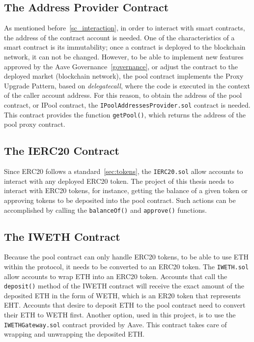 \documentclass[11pt,a4paper]{report}
\begin{document}
\subsection{The Address Provider Contract}
As mentioned before~\ref{sc_interaction}, in order to interact with smart contracts, the address of the contract account is needed. One of the characteristics of a smart contract is its immutability; once a contract is deployed to the blockchain network, it can not be changed. However, to be able to implement new features approved by the Aave Governance~\ref{governance}, or adjust the contract to the deployed market (blockchain network), the pool contract implements the Proxy Upgrade Pattern\cite{ozproxy}, based on \textit{delegatecall}\cite{delegatecall}, where the code is executed in the context of the caller account address. For this reason, to obtain the address of the pool contract, or IPool contract, the \verb|IPoolAddressesProvider.sol|\cite{pooladdrprov} contract is needed. This contract provides the function \verb|getPool()|, which returns the address of the pool proxy contract.

\subsection{The IERC20 Contract}
Since ERC20 follows a standard~\ref{sec:tokens}, the \verb|IERC20.sol| allow accounts to interact with any deployed ERC20 token. The project of this thesis needs to interact with ERC20 tokens, for instance, getting the balance of a given token or approving tokens to be deposited into the pool contract. Such actions can be accomplished by calling the \verb|balanceOf()| and \verb|approve()| functions.
\subsection{The IWETH Contract}
Because the pool contract can only handle ERC20 tokens, to be able to use ETH within the protocol, it needs to be converted to an ERC20 token. The \verb|IWETH.sol| allow accounts to wrap ETH into an ERC20 token. Accounts that call the \verb|deposit()| method of the IWETH contract will receive the exact amount of the deposited ETH in the form of WETH, which is an ER20 token that represents EHT. Accounts that desire to deposit ETH to the pool contract need  to convert their ETH to WETH first. Another option, used in this project, is to use the \verb|IWETHGateway.sol|\cite{wethgateway} contract provided by Aave. This contract takes care of wrapping and unwrapping the deposited ETH.
\end{document}
